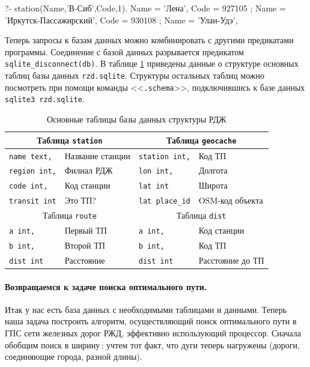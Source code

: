 \documentclass[a4paper,14pt, openany, twoside, draft]{extbook} %
\begin{document}
\begin{proexp}
?- station(Name,'В-Сиб',Code,1).
Name = 'Лена',
Code = 927105 ;
Name = 'Иркутск-Пассажирский',
Code = 930108 ;
Name = 'Улан-Удэ',
\end{proexp}


Теперь запросы к базам данных можно комбинировать с другими предикатами программы.  Соединение с базой данных разрывается предикатом \texttt{sqlite\_disconnect(db)}.  В таблице \ref{tab:dbstruct} приведены данные о структуре основных таблиц базы данных \texttt{rzd.sqlite}.  Структуры остальных таблиц можно посмотреть при помощи команды <<\texttt{.schema}>>, подключившись к базе данных \texttt{sqlite3 rzd.sqlite}.
\begin{table}[hbt]
\begin{center}\small
\caption{Основные таблицы базы данных структуры РДЖ} \label{tab:dbstruct}
\begin{tabular}{|l|l||l|l|}
 \hline
\multicolumn{2}{|c||}{Таблица \texttt{station}} & \multicolumn{2}{c|}{Таблица \texttt{geocache}} \\
\hline
\texttt{name text,} & Название станции & \texttt{station int,} & Код ТП \\
\hline
\texttt{region int,} & Филиал РДЖ & \texttt{lon int,} & Долгота \\
\hline
\texttt{code int,} & Код станции & \texttt{lat int} & Широта \\
\hline
\texttt{transit int} & Это ТП? & \texttt{lat place\_id} & OSM-код объекта \\
  \hline
\multicolumn{2}{|c||}{Таблица \texttt{route}} & \multicolumn{2}{c|}{Таблица \texttt{dist}} \\
  \hline
\texttt{a int,} & Первый ТП & \texttt{a int,} & Код станции \\
\hline
\texttt{b int,} & Второй ТП & \texttt{b int,} & Код ТП \\
\hline
\texttt{dist int} & Расстояние & \texttt{dist int} & Расстояние до ТП \\
\hline
\end{tabular}
\end{center}
\end{table}

\paragraph{Возвращаемся к задаче поиска оптимального пути.} \label{par:informedcont} Итак у нас есть база данных с необходимыми таблицами и данными.  Теперь наша задача построить алгоритм, осуществляющий поиск оптимального пути в ГПС сети железных дорог РЖД, эффективно использующий процессор.  Сначала обобщим поиск в ширину\,: учтем тот факт, что дуги теперь нагружены (дороги, соединяющие города, разной длины).
\end{document}
